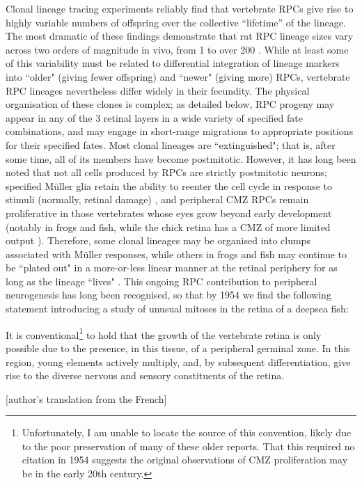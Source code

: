 Clonal lineage tracing experiments reliably find that vertebrate RPCs give rise to highly variable numbers of offspring over the collective ``lifetime'' of the lineage. The most dramatic of these findings demonstrate that rat RPC lineage sizes vary across two orders of magnitude in vivo, from 1 to over 200 \cite{Turner1990}. While at least some of this variability must be related to differential integration of lineage markers into ``older" (giving fewer offspring) and ``newer" (giving more) RPCs, vertebrate RPC lineages nevertheless differ widely in their fecundity. The physical organisation of these clones is complex; as detailed below, RPC progeny may appear in any of the 3 retinal layers in a wide variety of specified fate combinations, and may engage in short-range migrations to appropriate positions for their specified fates. Most clonal lineages are ``extinguished"; that is, after some time, all of its members have become postmitotic. However, it has long been noted that not all cells produced by RPCs are strictly postmitotic neurons; specified M{\"u}ller glia retain the ability to reenter the cell cycle in response to stimuli (normally, retinal damage) \cite{Dyer2000,Fischer2003a}, and peripheral CMZ RPCs remain proliferative in those vertebrates whose eyes grow beyond early development (notably in frogs and fish, while the chick retina has a CMZ of more limited output \cite{Fischer2000}). Therefore, some clonal lineages may be organised into clumps associated with M{\"u}ller responses, while others in frogs and fish may continue to be ``plated out" in a more-or-less linear manner at the retinal periphery for as long as the lineage ``lives" \cite{Centanin2011}. This ongoing RPC contribution to peripheral neurogenesis has long been recognised, so that by 1954 we find the following statement introducing a study of unusual mitoses in the retina of a deepsea fish: 

\begin{longquote}
  It is conventional\footnote{Unfortunately, I am unable to locate the source of this convention, likely due to the poor preservation of many of these older reports. That this required no citation in 1954 suggests the original observations of CMZ proliferation may be in the early 20th century.} to hold that the growth of the vertebrate retina is only possible due to the presence, in this tissue, of a peripheral germinal zone. In this region, young elements actively multiply, and, by subsequent differentiation, give rise to the diverse nervous and sensory constituents of the retina.
  \cite{Vilter1954}
  
  [author's translation from the French]
\end{longquote}

